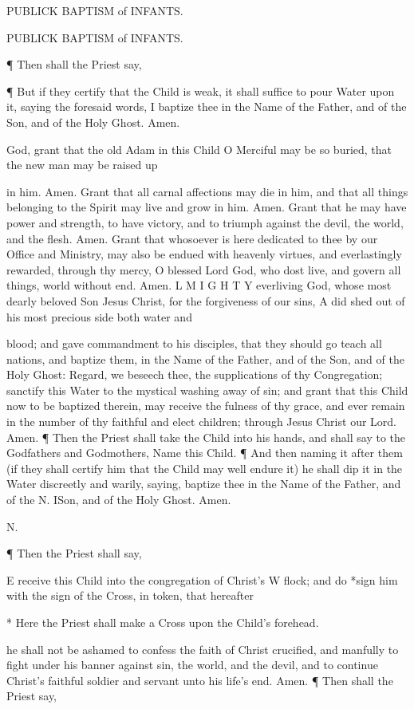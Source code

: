 PUBLICK BAPTISM of INFANTS.

PUBLICK BAPTISM of INFANTS.

¶ Then shall the Priest say,

¶ But if they certify that the Child is weak, it shall suffice to pour Water upon it, saying the foresaid words, I baptize thee in the Name of the Father, and of the Son, and of the Holy Ghost. Amen.

God, grant that the old Adam in this Child O Merciful may be so buried, that the new man may be raised up

in him. Amen. Grant that all carnal affections may die in him, and that all things belonging to the Spirit may live and grow in him. Amen. Grant that he may have power and strength, to have victory, and to triumph against the devil, the world, and the flesh. Amen. Grant that whosoever is here dedicated to thee by our Office and Ministry, may also be endued with heavenly virtues, and everlastingly rewarded, through thy mercy, O blessed Lord God, who dost live, and govern all things, world without end. Amen. L M I G H T Y everliving God, whose most dearly beloved Son Jesus Christ, for the forgiveness of our sins, A did shed out of his most precious side both water and

blood; and gave commandment to his disciples, that they should go teach all nations, and baptize them, in the Name of the Father, and of the Son, and of the Holy Ghost: Regard, we beseech thee, the supplications of thy Congregation; sanctify this Water to the mystical washing away of sin; and grant that this Child now to be baptized therein, may receive the fulness of thy grace, and ever remain in the number of thy faithful and elect children; through Jesus Christ our Lord. Amen. ¶ Then the Priest shall take the Child into his hands, and shall say to the Godfathers and Godmothers, Name this Child. ¶ And then naming it after them (if they shall certify him that the Child may well endure it) he shall dip it in the Water discreetly and warily, saying, baptize thee in the Name of the Father, and of the N. ISon, and of the Holy Ghost. Amen.

N.

¶ Then the Priest shall say,

E receive this Child into the congregation of Christ’s W flock; and do *sign him with the sign of the Cross, in token, that hereafter

* Here the Priest shall make a Cross upon the Child's forehead.

he shall not be ashamed to confess the faith of Christ crucified, and manfully to fight under his banner against sin, the world, and the devil, and to continue Christ’s faithful soldier and servant unto his life’s end. Amen. ¶ Then shall the Priest say,

